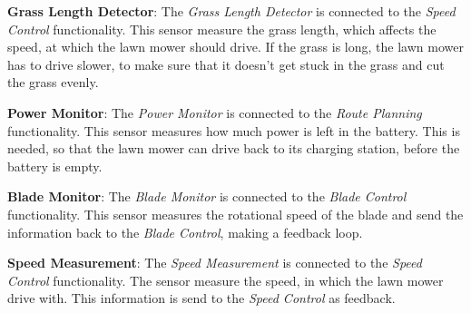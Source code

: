 \textbf{Grass Length Detector}:
The \textit{Grass Length Detector} is connected to the \textit{Speed Control} functionality. This sensor measure the  grass length, which affects the speed, at which the lawn mower should drive. If the grass is long, the lawn mower has to drive slower, to make sure that it doesn't get stuck in the grass and cut the grass evenly. 

\textbf{Power Monitor}:
The \textit{Power Monitor} is connected to the \textit{Route Planning} functionality. This sensor measures how much power  is left in the battery. This is needed, so that the lawn mower can drive back to its charging station, before the battery is empty.

\textbf{Blade Monitor}:
The \textit{Blade Monitor} is connected to the \textit{Blade Control} functionality. This sensor measures the rotational speed of the blade and send the information back to the \textit{Blade Control}, making a feedback loop.

\textbf{Speed Measurement}:
The \textit{Speed Measurement} is connected to the \textit{Speed Control} functionality. The sensor measure the speed, in which the lawn mower drive with. This information is send to the \textit{Speed Control} as feedback.